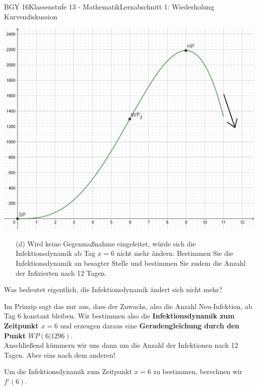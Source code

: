 \documentclass[oneside,openany,headings=optiontotoc,11pt,numbers=noenddot]{scrreprt}
\begin{document}
\begin{worksheet}{BGY 16}{Klassenstufe 13 - Mathematik}{Lernabschnitt 1: Wiederholung Kurvendiskussion}
\begin{itemize}
		\end{itemize}
		\begin{framed}
			\begin{center}
				\includegraphics[width=\textwidth]{../99_Bilder/LSG2.png}
			\end{center}
		\end{framed}
		\begin{itemize}
			\item[(d)] Wird keine Gegenmaßnahme eingeleitet, würde sich die Infektionsdynamik ab Tag \(x = 6\) nicht mehr ändern. Bestimmen Sie die Infektionsdynamik an besagter Stelle und bestimmen Sie zudem die Anzahl der Infizierten nach 12 Tagen.
		\end{itemize}
		\begin{framed}
			\noindent
			Was bedeutet eigentlich, die Infektionsdynamik ändert sich nicht mehr?\\
			\par\noindent
			Im Prinzip sagt das nur aus, dass der Zuwachs, also die Anzahl Neu-Infektion, ab Tag 6 konstant bleiben. Wir bestimmen also die \textbf{Infektionsdynamik zum Zeitpunkt \(x=6\)} und erzeugen daraus eine \textbf{Geradengleichung durch den Punkt \(WP(6|1296)\)}.\\
			Anschließend kümmern wir uns dann um die Anzahl der Infektionen nach 12 Tagen. Aber eins nach dem anderen!\\
			\par\noindent
			Um die Infektionsdynamik zum Zeitpunkt \(x=6\) zu bestimmen, berechnen wir \(f'(6)\).\\

\end{framed}
\end{worksheet}
\end{document}
